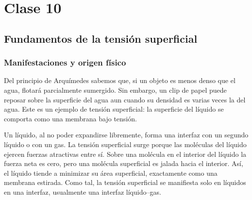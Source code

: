 \shorthandoff{<>}
















\shorthandon{<>}

\chapter{Clase 10}

\section{Fundamentos de la tensión superficial}

\subsection{Manifestaciones y origen físico}

Del principio de Arquímedes sabemos que, si un objeto es menos denso que el agua, flotará parcialmente sumergido. Sin embargo, un clip de papel puede reposar sobre la superficie del agua aun cuando su densidad es varias veces la del agua. Este es un ejemplo de tensión superficial: la superficie del líquido se comporta como una membrana bajo tensión.

\figuraInsectoTensionSuperficial

Un líquido, al no poder expandirse libremente, forma una interfaz con un segundo líquido o con un gas. La tensión superficial surge porque las moléculas del líquido ejercen fuerzas atractivas entre sí. Sobre una molécula en el interior del líquido la fuerza neta es cero, pero una molécula superficial es jalada hacia el interior. Así, el líquido tiende a minimizar su área superficial, exactamente como una membrana estirada. Como tal, la tensión superficial se manifiesta solo en líquidos en una interfaz, usualmente una interfaz líquido--gas.

\figuraFuerzasMolecularesSuperficie

